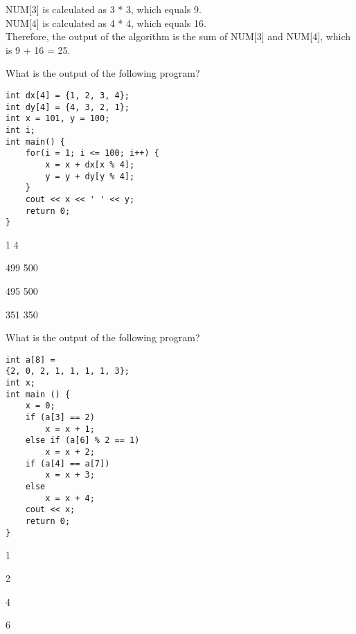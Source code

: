 \begin{questions}
{NUM[3] is calculated as 3 * 3, which equals 9.\\
NUM[4] is calculated as 4 * 4, which equals 16.\\
Therefore, the output of the algorithm is the sum of NUM[3] and NUM[4], which is 9 + 16 = 25.
    \fi
}

 What is the output of the following program?

\begin{lstlisting}
int dx[4] = {1, 2, 3, 4};
int dy[4] = {4, 3, 2, 1};
int x = 101, y = 100;
int i;
int main() {
    for(i = 1; i <= 100; i++) {
        x = x + dx[x % 4];
        y = y + dy[y % 4];
    }
    cout << x << ' ' << y;
    return 0;
}
\end{lstlisting}

\begin{multiplechoice}
    \item 1 4
    \item 499 500
    \item 495 500
    \item 351 350
\end{multiplechoice}

\label{q:hkoi:2022hj:q16}

 What is the output of the following program?

\begin{lstlisting}
int a[8] =
{2, 0, 2, 1, 1, 1, 1, 3};
int x;
int main () {
    x = 0;
    if (a[3] == 2)
        x = x + 1;
    else if (a[6] % 2 == 1)
        x = x + 2;
    if (a[4] == a[7])
        x = x + 3;
    else
        x = x + 4;
    cout << x;
    return 0;
}
\end{lstlisting}

\begin{multiplechoice}
    \item 1
    \item 2
    \item 4
    \item 6
\end{multiplechoice}

\label{q:hkoi:2022hj:q17}
\end{questions}
